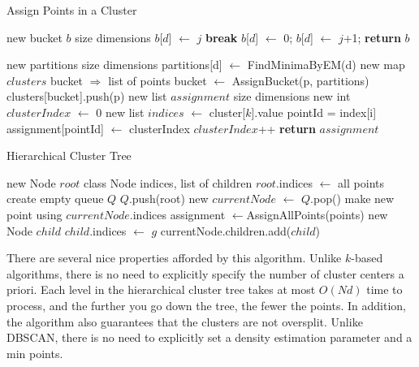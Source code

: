 \documentclass{acm_proc_article-sp}
\begin{document}
\begin{algorithm}
\caption{Assign Points in a Cluster}\label{euclid}
\begin{algorithmic}[1]
\State new bucket $b$ \Comment size dimensions
\State $b$[$d$] $\leftarrow$ $j$
\State \textbf{break}
\EndIf
{}
\State $b$[$d$] $\leftarrow$ 0;
\Else
\State $b$[$d$] $\leftarrow$ $j$+1;
\EndIf
\EndFor
\EndFor
\State \textbf{return} $b$
\EndProcedure
\State

\State new partitions \Comment size dimensions
\State partitions[d] $\leftarrow$ FindMinimaByEM(d)
\EndFor
\State new map $clusters$ \Comment bucket $\Rightarrow$ list of points
\State bucket $\leftarrow$ AssignBucket(p, partitions)
\State clusters[bucket].push(p)
\EndFor
\State new list $assignment$ \Comment size dimensions
\State new int $clusterIndex$ $\leftarrow$ 0
\State new list $indices$ $\leftarrow$ cluster[$k$].value
\State pointId = index[i] 
\State assignment[pointId] $\leftarrow$  clusterIndex
\EndFor
\State $clusterIndex$++
\EndFor
\State \textbf{return} $assignment$
\EndProcedure
\end{algorithmic}
\end{algorithm}


\begin{algorithm}
\caption{Hierarchical Cluster Tree}\label{hct}
\begin{algorithmic}[1]
\State new Node $root$ \Comment class Node indices, list of children
\State $root$.indices $\leftarrow$ all points
\State create empty queue $Q$
\State $Q$.push(root)
\State new $currentNode$ $\leftarrow$ $Q$.pop()
\State make new point using $currentNode$.indices
\State assignment $\leftarrow $AssignAllPoints(points)
\State new Node $child$
\State $child$.indices $\leftarrow$ $g$
\State currentNode.children.add($child$)
\EndFor
\EndWhile
\EndProcedure
\end{algorithmic}
\end{algorithm}

There are several nice properties afforded by this algorithm. Unlike \(k\)-based algorithms, there is no need to explicitly specify the number of cluster centers a priori. Each level in the hierarchical cluster tree takes at most \(O(Nd)\) time to process, and the further you go down the tree, the fewer the points. In addition, the algorithm also guarantees that the clusters are not oversplit. Unlike DBSCAN, there is no need to explicitly set a density estimation parameter and a min points. 
\end{document}
